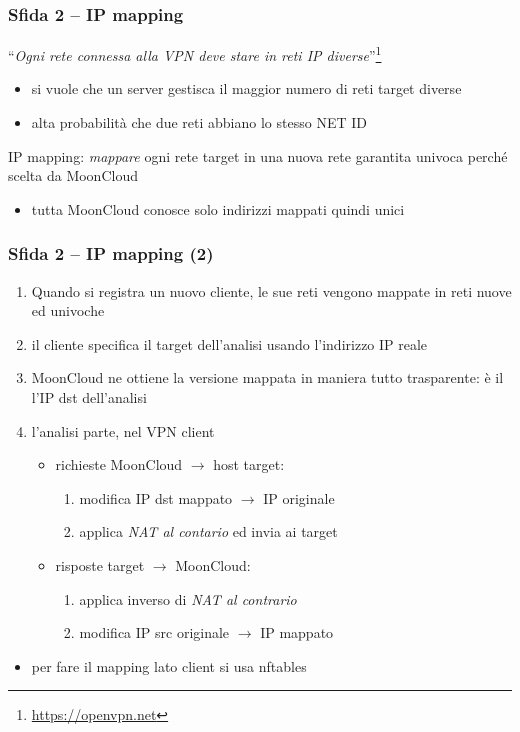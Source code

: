 \begin{frame}
	\frametitle{Sfida 2 -- IP mapping}
	``\textit{Ogni rete connessa alla VPN deve stare in reti IP diverse}''\footnote{\url{https://openvpn.net}}
	\begin{itemize}
		\item si vuole che un server gestisca il maggior numero di reti target diverse
		\item alta probabilità che due reti abbiano lo stesso NET ID
	\end{itemize}
	
	\alert{IP mapping}: \textit{mappare} ogni rete target in una nuova rete
	\alert{garantita univoca} perché scelta da MoonCloud
	\begin{itemize}
		\item tutta MoonCloud conosce solo indirizzi mappati quindi unici
	\end{itemize}
\end{frame}

\begin{frame}
	\frametitle{Sfida 2 -- IP mapping (2)}
	\begin{enumerate}
		\item Quando si registra un nuovo cliente, le sue reti vengono \alert{mappate}
		      in reti nuove ed univoche
		      
		\item il cliente specifica il target dell'analisi usando l'indirizzo IP reale
		              
		\item MoonCloud ne ottiene la \alert{versione mappata} in maniera tutto
		      \alert{trasparente}: è il l'IP dst dell'analisi
		      
		\item l'analisi parte, nel \alert{VPN client}
		      \begin{itemize}
		      	\item richieste MoonCloud $\rightarrow$ host target:
		      	      \begin{enumerate}
		      	      	\item modifica IP dst mappato $\rightarrow$ IP originale
		      	      	\item applica \textit{NAT al contario} ed invia ai target
		      	      \end{enumerate}
		      	\item risposte target $\rightarrow$ MoonCloud:
		      	      \begin{enumerate}
		      	      	\item applica inverso di \textit{NAT al contrario}
		      	      	\item modifica IP src originale $\rightarrow$ IP mappato
		      	      \end{enumerate}
		      \end{itemize}
		      
	\end{enumerate}
	
	\begin{itemize}
		\item per fare il mapping lato client si usa \alert{nftables}
	\end{itemize}
\end{frame}

